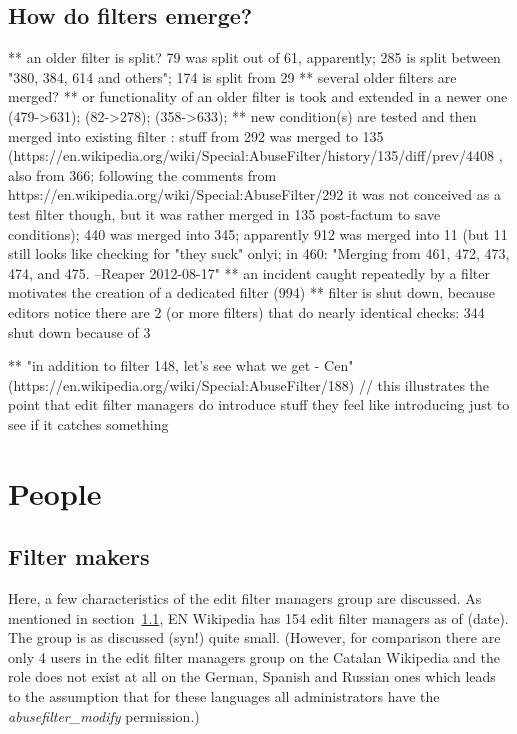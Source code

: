 \subsection{How do filters emerge?}
  ** an older filter is split? 79 was split out of 61, apparently; 285 is split between "380, 384, 614 and others"; 174 is split from 29
  ** several older filters are merged?
  ** or functionality of an older filter is took and extended in a newer one (479->631); (82->278); (358->633);
  ** new condition(s) are tested and then merged into existing filter : stuff from 292 was merged to 135 (https://en.wikipedia.org/wiki/Special:AbuseFilter/history/135/diff/prev/4408 , also from 366; following the comments from https://en.wikipedia.org/wiki/Special:AbuseFilter/292 it was not conceived as a test filter though, but it was rather merged in 135 post-factum to save conditions); 440 was merged into 345; apparently 912 was merged into 11 (but 11 still looks like checking for "they suck" only^^); in 460: "Merging from 461, 472, 473, 474, and 475. --Reaper 2012-08-17"
  ** an incident caught repeatedly by a filter motivates the creation of a dedicated filter (994)
  ** filter is shut down, because editors notice there are 2 (or more filters) that do nearly identical checks: 344 shut down because of 3

  ** "in addition to filter 148, let's see what we get - Cen" (https://en.wikipedia.org/wiki/Special:AbuseFilter/188) // this illustrates the point that edit filter managers do introduce stuff they feel like introducing just to see if it catches something

\section{People}
\subsection{Filter makers}

Here, a few characteristics of the edit filter managers group are discussed.
As mentioned in section~\ref{}, EN Wikipedia has 154 edit filter managers as of (date).
The group is as discussed (syn!) quite small.
(However, for comparison there are only 4 users in the edit filter managers group on the Catalan Wikipedia and the role does not exist at all on the German, Spanish and Russian ones which leads to the assumption that for these languages all administrators have the \emph{abusefilter\_modify} permission.) %

